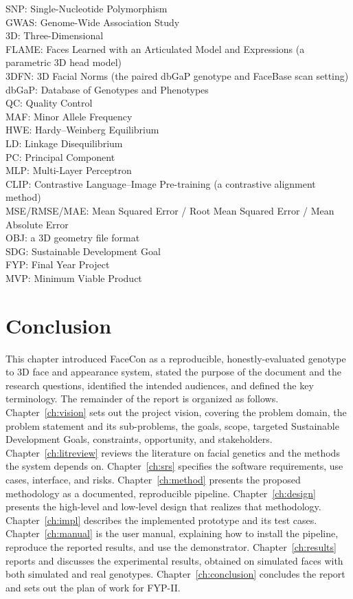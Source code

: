SNP: Single-Nucleotide Polymorphism\\
GWAS: Genome-Wide Association Study\\
3D: Three-Dimensional\\
FLAME: Faces Learned with an Articulated Model and Expressions (a parametric 3D head model)\\
3DFN: 3D Facial Norms (the paired dbGaP genotype and FaceBase scan setting)\\
dbGaP: Database of Genotypes and Phenotypes\\
QC: Quality Control\\
MAF: Minor Allele Frequency\\
HWE: Hardy--Weinberg Equilibrium\\
LD: Linkage Disequilibrium\\
PC: Principal Component\\
MLP: Multi-Layer Perceptron\\
CLIP: Contrastive Language--Image Pre-training (a contrastive alignment method)\\
MSE/RMSE/MAE: Mean Squared Error / Root Mean Squared Error / Mean Absolute Error\\
OBJ: a 3D geometry file format\\
SDG: Sustainable Development Goal\\
FYP: Final Year Project\\
MVP: Minimum Viable Product

\section{Conclusion}
This chapter introduced FaceCon as a reproducible, honestly-evaluated genotype to 3D face and appearance system, stated the purpose of the document and the research questions, identified the intended audiences, and defined the key terminology. The remainder of the report is organized as follows. Chapter~\ref{ch:vision} sets out the project vision, covering the problem domain, the problem statement and its sub-problems, the goals, scope, targeted Sustainable Development Goals, constraints, opportunity, and stakeholders. Chapter~\ref{ch:litreview} reviews the literature on facial genetics and the methods the system depends on. Chapter~\ref{ch:srs} specifies the software requirements, use cases, interface, and risks. Chapter~\ref{ch:method} presents the proposed methodology as a documented, reproducible pipeline. Chapter~\ref{ch:design} presents the high-level and low-level design that realizes that methodology. Chapter~\ref{ch:impl} describes the implemented prototype and its test cases. Chapter~\ref{ch:manual} is the user manual, explaining how to install the pipeline, reproduce the reported results, and use the demonstrator. Chapter~\ref{ch:results} reports and discusses the experimental results, obtained on simulated faces with both simulated and real genotypes. Chapter~\ref{ch:conclusion} concludes the report and sets out the plan of work for FYP-II.
